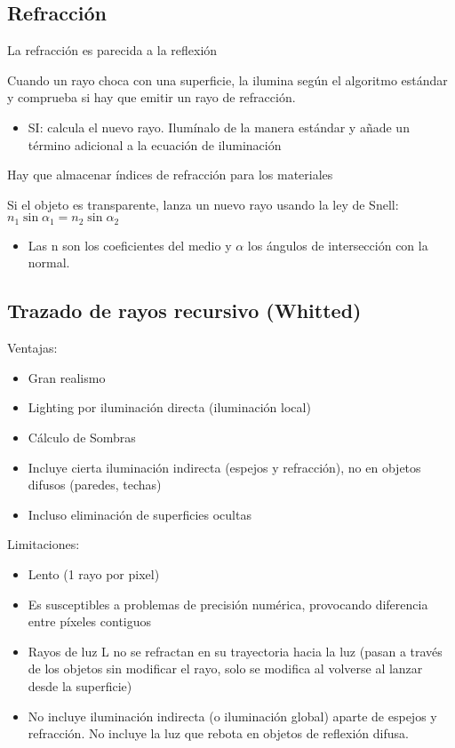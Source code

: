 \subsection{Refracción}
La refracción es parecida a la reflexión

Cuando un rayo choca con una superficie, la ilumina según el algoritmo estándar y comprueba si hay que emitir un rayo de
refracción.
\begin{itemize}
    \item SI: calcula el nuevo rayo. Ilumínalo de la manera estándar y añade un término adicional a la ecuación de iluminación
\end{itemize}

Hay que almacenar índices de refracción para los materiales

Si el objeto es transparente, lanza un nuevo rayo usando la ley de Snell: $n_1 \sin \alpha_1 = n_2 \sin \alpha_2$
\begin{itemize}
    \item Las n son los coeficientes del medio y $\alpha$ los ángulos de intersección con la normal.
\end{itemize}

\subsection{Trazado de rayos recursivo (Whitted)}
Ventajas:
\begin{itemize}
    \item Gran realismo
    \item Lighting por iluminación directa (iluminación local)
    \item Cálculo de Sombras
    \item Incluye cierta iluminación indirecta (espejos y refracción), no en objetos difusos (paredes, techas)
    \item Incluso eliminación de superficies ocultas
\end{itemize}

Limitaciones:
\begin{itemize}
    \item Lento (1 rayo por pixel)
    \item Es susceptibles a problemas de precisión numérica, provocando diferencia entre píxeles contiguos
    \item Rayos de luz L no se refractan en su trayectoria hacia la luz (pasan a través de los objetos sin modificar el rayo, solo se modifica al volverse al lanzar desde la superficie)
    \item No incluye iluminación indirecta (o iluminación global) aparte de espejos y refracción. No incluye la luz que rebota en objetos de reflexión difusa.
\end{itemize}

